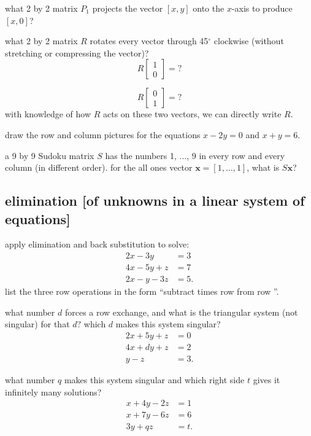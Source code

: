 \documentclass[addpoints]{exam}
\begin{document}
\begin{questions}
\question what 2 by 2 matrix $P_1$ projects the vector $[x, y]$ onto the $x$-axis to produce $[x,0]$?

\question what 2 by 2 matrix $R$ rotates every vector through 45$^\circ$ clockwise (without stretching or compressing the vector)? 
\begin{equation*}
	R
	\begin{bmatrix}
	 1 \\
	 0
	\end{bmatrix}
	=
	?
\end{equation*}

\begin{equation*}
	R
	\begin{bmatrix}
	 0 \\
	 1
	\end{bmatrix}
	=
	?
\end{equation*}
with knowledge of how $R$ acts on these two vectors, we can directly write $R$. 

\question draw the row and column pictures for the equations $x-2y=0$ and $x+y=6$.

\question a 9 by 9 Sudoku matrix $S$ has the numbers 1, ..., 9 in every row and every column (in different order). for the all ones vector $\mathbf{x}=[1, ..., 1]$, what is $S\mathbf{x}$?

\subsection*{elimination [of unknowns in a linear system of equations]}
\question apply elimination and back substitution to solve:
\begin{align*}
	2x-3y &=3 \\
	4x-5y+z&=7 \\
	2x-y-3z&=5.
\end{align*}
list the three row operations in the form ``subtract \fillin times row \fillin from row \fillin''.

\question what number $d$ forces a row exchange, and what is the triangular system (not singular) for that $d$? which $d$ makes this system singular?
\begin{align*}
	2x+5y+z &=0 \\
	4x+dy+z&=2 \\
	y-z&=3.
\end{align*}

\question what number $q$ makes this system singular and which right side $t$ gives it infinitely many solutions?
\begin{align*}
	x+4y-2z &=1 \\
	x+7y-6z&=6 \\
	3y+qz&=t.
\end{align*}


\end{questions}
\end{document}

